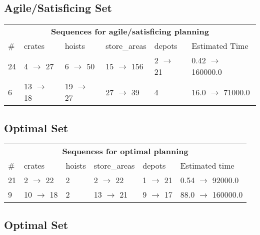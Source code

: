 \documentclass{article}
\begin{document}
                         \subsection*{Agile/Satisficing Set}

                        \begin{center}
                        \begin{tabular}{@{}l|l|l|l|l|l@{}}
                        \multicolumn{6}{c}{\bf \large Sequences for agile/satisficing planning}\\
                        \# & crates & hoists & store\_areas & depots & Estimated Time\\\midrule
                        24&4 $\rightarrow$ 27&6 $\rightarrow$ 50&15 $\rightarrow$ 156&2 $\rightarrow$ 21&0.42 $\rightarrow$ 160000.0\\
6&13 $\rightarrow$ 18&19 $\rightarrow$ 27&27 $\rightarrow$ 39&4&16.0 $\rightarrow$ 71000.0
                        \end{tabular}
                        \end{center}
                    
                            \subsection*{Optimal Set}

                            \begin{center}
                            \begin{tabular}{@{}l|l|l|l|l|l@{}}
                            \multicolumn{6}{c}{\bf \large Sequences for optimal planning}\\
                            \# & crates & hoists & store\_areas & depots & Estimated time\\\midrule
                            21&2 $\rightarrow$ 22&2&2 $\rightarrow$ 22&1 $\rightarrow$ 21&0.54 $\rightarrow$ 92000.0\\
9&10 $\rightarrow$ 18&2&13 $\rightarrow$ 21&9 $\rightarrow$ 17&88.0 $\rightarrow$ 160000.0
                            \end{tabular}
                            \end{center}
                    
                                \subsection*{Optimal Set}
                                
\end{document}
